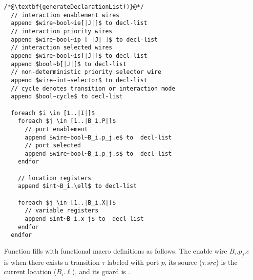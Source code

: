 \begin{lstlisting}
/*@\textbf{generateDeclarationList()}@*/
  // interaction enablement wires
  append $wire~bool~ie[|J|]$ to decl-list
  // interaction priority wires
  append $wire~bool~ip [ |J| ]$ to decl-list 
  // interaction selected wires
  append $wire~bool~is[|J|]$ to decl-list 
  append $bool~b[|J|]$ to decl-list 
  // non-deterministic priority selector wire
  append $wire~int~selector$ to decl-list 
  // cycle denotes transition or interaction mode
  append $bool~cycle$ to decl-list  

  foreach $i \in [1..|I|]$
    foreach $j \in [1..|B_i.P|]$ 
      // port enablement
      append $wire~bool~B_i.p_j.e$ to  decl-list 
      // port selected
      append $wire~bool~B_i.p_j.s$ to  decl-list 
    endfor

    // location registers
    append $int~B_i.\ell$ to decl-list
    
    foreach $j \in [1..|B_i.X|]$ 
      // variable registers
      append $int~B_i.x_j$ to  decl-list 
    endfor
  endfor
\end{lstlisting}
%
Function  fills  with functional macro definitions as follows.
The enable wire $B_i.p_j.e$ is \true when there exists a transition $\tau$ labeled with port $p$, its source ($\tau.\mathit{src}$) is the current location ($B_i.\ell$), and its guard is \true. 


